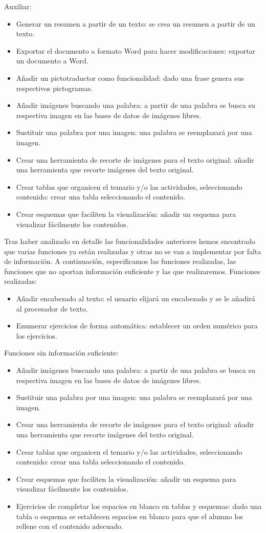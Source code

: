 Auxiliar:
\begin{itemize}
  \item Generar un resumen a partir de un texto: se crea un resumen a partir de un texto.
  \item Exportar el documento a formato Word para hacer modificaciones: exportar un documento a Word.
  \item Añadir un pictotraductor como funcionalidad: dado una frase genera sus respectivos pictogramas.
  \item Añadir imágenes buscando una palabra: a partir de una palabra se busca su respectiva imagen en las bases de datos de imágenes libres.
  \item Sustituir una palabra por una imagen: una palabra se reemplazará por una imagen.
  \item Crear una herramienta de recorte de imágenes para el texto original: añadir una herramienta que recorte imágenes del texto original.
  \item Crear tablas que organicen el temario y/o las actividades, seleccionando contenido:  crear una tabla seleccionando el contenido.
  \item Crear esquemas que faciliten la visualización: añadir un esquema para visualizar fácilmente los contenidos.
\end{itemize}
Tras haber analizado en detalle las funcionalidades anteriores hemos encontrado que varias funciones ya están realizadas y otras no se van a implementar por falta de información. A continuación, especificamos las funciones realizadas, las funciones que no aportan información suficiente y las que realizaremos.
\newline
Funciones realizadas:
  \begin{itemize}
    \item Añadir encabezado al texto: el usuario elijará un encabezado y se le añadirá al procesador de texto.
    \item Enumerar ejercicios de forma automática: establecer un orden numérico para los ejercicios.
  \end{itemize}
Funciones sin información suficiente:
\begin{itemize}
  \item Añadir imágenes buscando una palabra: a partir de una palabra se busca su respectiva imagen en las bases de datos de imágenes libres.
  \item Sustituir una palabra por una imagen: una palabra se reemplazará por una imagen.
  \item Crear una herramienta de recorte de imágenes para el texto original: añadir una herramienta que recorte imágenes del texto original.
  \item Crear tablas que organicen el temario y/o las actividades, seleccionando contenido:  crear una tabla seleccionando el contenido.
  \item Crear esquemas que faciliten la visualización: añadir un esquema para visualizar fácilmente los contenidos.
  \item Ejercicios de completar los espacios en blanco en tablas y esquemas: dado una tabla o esquema se establecen espacios en blanco para que el alumno los rellene con el contenido adecuado.
\end{itemize}

